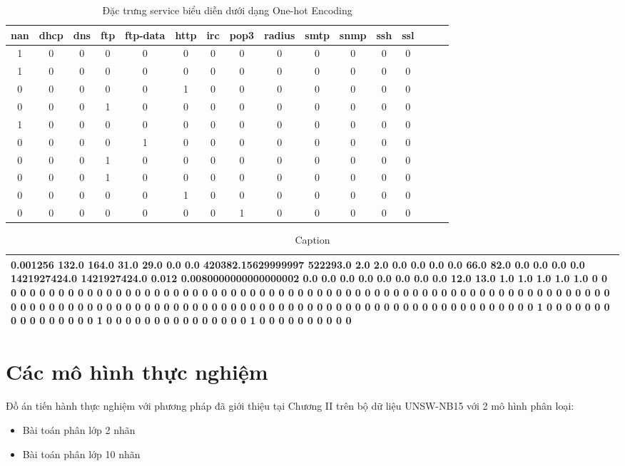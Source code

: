 \begin{table}[H]
\centering
\begin{tabular}{|c|c|c|c|c|c|c|c|c|c|c|c|c|c|c|c|}
    \textbf{nan} & \textbf{dhcp} & \textbf{dns} & \textbf{ftp} & \textbf{ftp-data} & \textbf{http} & \textbf{irc} & \textbf{pop3} & \textbf{radius} & \textbf{smtp} & \textbf{snmp} & \textbf{ssh} & \textbf{ssl}\\
    \hline
    1 & 0 & 0 & 0 & 0 & 0 & 0 & 0 & 0 & 0 & 0 & 0 & 0\\
    1 & 0 & 0 & 0 & 0 & 0 & 0 & 0 & 0 & 0 & 0 & 0 & 0\\
    0 & 0 & 0 & 0 & 0 & 1 & 0 & 0 & 0 & 0 & 0 & 0 & 0\\
    0 & 0 & 0 & 1 & 0 & 0 & 0 & 0 & 0 & 0 & 0 & 0 & 0\\
    1 & 0 & 0 & 0 & 0 & 0 & 0 & 0 & 0 & 0 & 0 & 0 & 0\\
    0 & 0 & 0 & 0 & 1 & 0 & 0 & 0 & 0 & 0 & 0 & 0 & 0\\
    0 & 0 & 0 & 1 & 0 & 0 & 0 & 0 & 0 & 0 & 0 & 0 & 0\\
    0 & 0 & 0 & 1 & 0 & 0 & 0 & 0 & 0 & 0 & 0 & 0 & 0\\
    0 & 0 & 0 & 0 & 0 & 1 & 0 & 0 & 0 & 0 & 0 & 0 & 0\\
    0 & 0 & 0 & 0 & 0 & 0 & 0 & 1 & 0 & 0 & 0 & 0 & 0\\ 

\end{tabular}
\caption{Đặc trưng service biểu diễn dưới dạng One-hot Encoding}
\end{table} 

\begin{table}[H]
    \centering
    \begin{tabular}{|m{14cm}|}
    \hline
         0.001256 132.0 164.0 31.0 29.0 0.0 0.0 420382.15629999997 522293.0 2.0 2.0
 0.0 0.0 0.0 0.0 66.0 82.0 0.0 0.0 0.0 0.0 1421927424.0 1421927424.0 0.012
 0.0080000000000000002 0.0 0.0 0.0 0.0 0.0 0.0 0.0 0.0 12.0 13.0 1.0 1.0
 1.0 1.0 1.0 0 0 0 0 0 0 0 0 0 0 0 0 0 0 0 0 0 0 0 0 0 0 0 0 0 0 0 0 0 0 0
 0 0 0 0 0 0 0 0 0 0 0 0 0 0 0 0 0 0 0 0 0 0 0 0 0 0 0 0 0 0 0 0 0 0 0 0 0
 0 0 0 0 0 0 0 0 0 0 0 0 0 0 0 0 0 0 0 0 0 0 0 0 0 0 0 0 0 0 0 0 0 0 0 0 0
 0 0 0 0 0 0 0 0 0 0 0 0 0 0 0 1 0 0 0 0 0 0 0 0 0 0 0 0 0 0 0 0 1 0 0 0 0
 0 0 0 0 0 0 0 0 0 0 0 1 0 0 0 0 0 0 0 0 0 0\\
         \hline
    \end{tabular}
    \caption{Caption}
\end{table}
\section{Các mô hình thực nghiệm}
Đồ án tiến hành thực nghiệm với phương pháp đã giới thiệu tại Chương II trên bộ dữ liệu UNSW-NB15 với 2 mô hình phân loại:
\begin{itemize}
    \item Bài toán phân lớp 2 nhãn
    \item Bài toán phân lớp 10 nhãn
\end{itemize}
